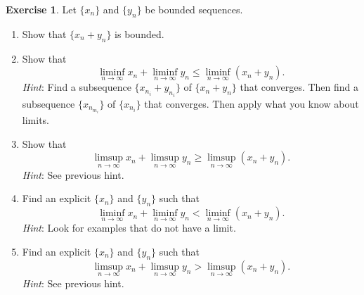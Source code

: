 \documentclass[12pt]{article}
\theoremstyle{definition}
\newtheorem{exercise}{Exercise}
\begin{document}
\begin{exercise}
    Let $\{x_n\}$ and $\{y_n\}$ be bounded sequences.
    \begin{enumerate}[label=\alph*)]
        \item Show that $\{x_n + y_n\}$ is bounded.
        \item Show that
        \[
            \liminf_{n \to \infty}x_n + \liminf_{n \to \infty}y_n \leq \liminf_{n \to \infty}(x_n + y_n).
        \]
        \textit{Hint}: Find a subsequence $\{x_{n_i} + y_{n_i}\}$ of $\{x_n + y_n\}$ that converges. Then find a subsequence $\{x_{n_{m_i}}\}$ of $\{x_{n_i}\}$ that converges. Then apply what you know about limits.
        \item Show that
        \[
            \limsup_{n \to \infty}x_n + \limsup_{n \to \infty}y_n \geq \limsup_{n \to \infty}(x_n + y_n).
        \]
        \textit{Hint}: See previous hint.
        \item Find an explicit $\{x_n\}$ and $\{y_n\}$ such that
        \[
            \liminf_{n \to \infty}x_n + \liminf_{n \to \infty}y_n < \liminf_{n \to \infty}(x_n + y_n).
        \]
        \textit{Hint}: Look for examples that do not have a limit.
        \item Find an explicit $\{x_n\}$ and $\{y_n\}$ such that
        \[
            \limsup_{n \to \infty}x_n + \limsup_{n \to \infty}y_n > \limsup_{n \to \infty}(x_n + y_n).
        \]
        \textit{Hint}: See previous hint.
    \end{enumerate}
\end{exercise}
\end{document}
